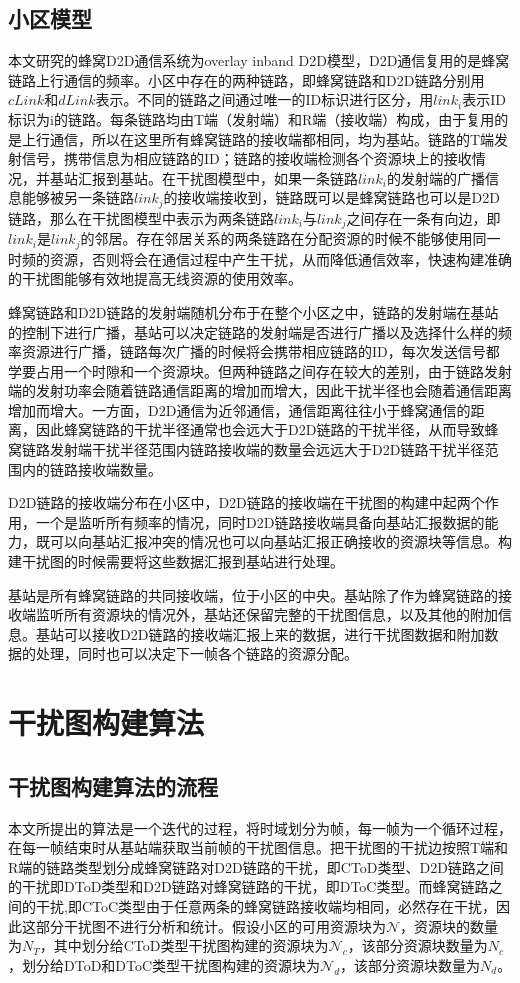\documentclass[figurelist,tablelist,algorithmlist,nomlist,masters]{seuthesix}
\begin{document}
	\subsection{小区模型}
	本文研究的蜂窝D2D通信系统为overlay inband D2D模型，D2D通信复用的是蜂窝链路上行通信的频率。小区中存在的两种链路，即蜂窝链路和D2D链路分别用$cLink$和$dLink$表示。不同的链路之间通过唯一的ID标识进行区分，用$link_i$表示ID标识为i的链路。每条链路均由T端（发射端）和R端（接收端）构成，由于复用的是上行通信，所以在这里所有蜂窝链路的接收端都相同，均为基站。链路的T端发射信号，携带信息为相应链路的ID；链路的接收端检测各个资源块上的接收情况，并基站汇报到基站。在干扰图模型中，如果一条链路$link_i$的发射端的广播信息能够被另一条链路$link_j$的接收端接收到，链路既可以是蜂窝链路也可以是D2D链路，那么在干扰图模型中表示为两条链路$link_i$与$link_j$之间存在一条有向边，即$link_i$是$link_j$的邻居。存在邻居关系的两条链路在分配资源的时候不能够使用同一时频的资源，否则将会在通信过程中产生干扰，从而降低通信效率，快速构建准确的干扰图能够有效地提高无线资源的使用效率。
	
	蜂窝链路和D2D链路的发射端随机分布于在整个小区之中，链路的发射端在基站的控制下进行广播，基站可以决定链路的发射端是否进行广播以及选择什么样的频率资源进行广播，链路每次广播的时候将会携带相应链路的ID，每次发送信号都学要占用一个时隙和一个资源块。但两种链路之间存在较大的差别，由于链路发射端的发射功率会随着链路通信距离的增加而增大，因此干扰半径也会随着通信距离增加而增大。一方面，D2D通信为近邻通信，通信距离往往小于蜂窝通信的距离，因此蜂窝链路的干扰半径通常也会远大于D2D链路的干扰半径，从而导致蜂窝链路发射端干扰半径范围内链路接收端的数量会远远大于D2D链路干扰半径范围内的链路接收端数量。
	
	D2D链路的接收端分布在小区中，D2D链路的接收端在干扰图的构建中起两个作用，一个是监听所有频率的情况，同时D2D链路接收端具备向基站汇报数据的能力，既可以向基站汇报冲突的情况也可以向基站汇报正确接收的资源块等信息。构建干扰图的时候需要将这些数据汇报到基站进行处理。
	
	基站是所有蜂窝链路的共同接收端，位于小区的中央。基站除了作为蜂窝链路的接收端监听所有资源块的情况外，基站还保留完整的干扰图信息，以及其他的附加信息。基站可以接收D2D链路的接收端汇报上来的数据，进行干扰图数据和附加数据的处理，同时也可以决定下一帧各个链路的资源分配。
	
	
	\section{干扰图构建算法}
	
	\subsection{干扰图构建算法的流程}
	本文所提出的算法是一个迭代的过程，将时域划分为帧，每一帧为一个循环过程，在每一帧结束时从基站端获取当前帧的干扰图信息。把干扰图的干扰边按照T端和R端的链路类型划分成蜂窝链路对D2D链路的干扰，即CToD类型、D2D链路之间的干扰即DToD类型和D2D链路对蜂窝链路的干扰，即DToC类型。而蜂窝链路之间的干扰,即CToC类型由于任意两条的蜂窝链路接收端均相同，必然存在干扰，因此这部分干扰图不进行分析和统计。假设小区的可用资源块为$\mathcal{N}$，资源块的数量为$N_T$，其中划分给CToD类型干扰图构建的资源块为$\mathcal{N}_c$，该部分资源块数量为$N_c$，划分给DToD和DToC类型干扰图构建的资源块为$\mathcal{N}_d$，该部分资源块数量为$N_d$。
	
\end{document}
